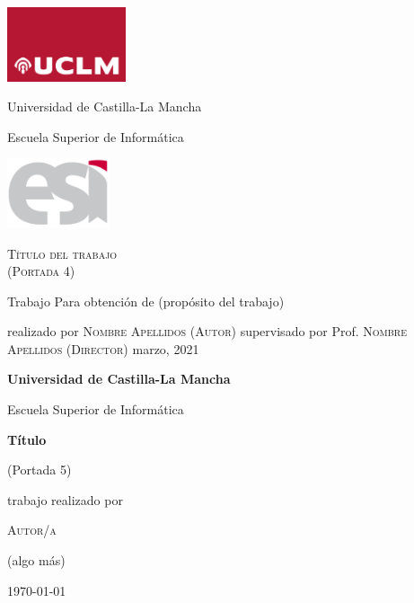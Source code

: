 \documentclass[12pt,a4paper]{report}
\begin{document}
\begin{titlepage}
    \centering %
	\includegraphics[width=3.5cm]{uclm_logo}
	\hfill
	\parbox{.5\linewidth}{%
		\centering
		{\LARGE Universidad de Castilla-La Mancha\par}
		\vspace{.05\textheight}
		{\large Escuela Superior de Informática\par}
	}
	\hfill
	\includegraphics[width=3cm]{esi_logo}
	\par
    \par\vspace{.15\textheight}
    {\huge\textsc{Título del trabajo \\
     (Portada 4)}\par}
    \Large
    \par\vspace{.1\textheight}
    Trabajo
    \medbreak
    Para obtención de
    (propósito del trabajo)
    \par\vspace{.08\textheight}
    realizado por
    \medbreak
    \textsc{Nombre Apellidos (Autor)}
    \bigbreak
    supervisado por
    \medbreak
    Prof. \textsc{Nombre Apellidos (Director)}
    \vfill
    \noindent%
    \small \hfill marzo, 2021 
\end{titlepage}


\begin{titlepage}
    \begin{center}
    	\LARGE
    	{\bfseries Universidad de Castilla-La Mancha\par}
    	Escuela Superior de Informática\par
    	\vspace{4cm}
    	{\huge\bfseries Título\par}
    	{\small (Portada 5)}
    	\vspace{3cm}
    	\par
    \end{center}
	\hfill\begin{minipage}{.5\linewidth}
		\normalsize
		trabajo realizado por\par
		\textsc{Autor/a}\par
		(algo más)
	\end{minipage}
	\vfill
	\centering	\today
\end{titlepage}
\end{document}
